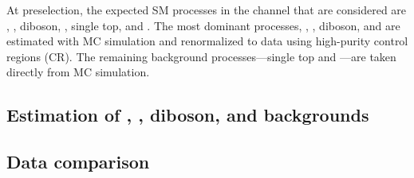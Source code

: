 
At preselection, the expected SM processes in the \mumubj channel that are considered are \ZJETS, \ttbar, diboson, \TTV, single top, and \WJETS. The most dominant processes, \ZJETS, \ttbar, diboson, and \TTV are estimated with MC simulation and renormalized to data using high-purity control regions (CR). The remaining background processes---single top and \WJETS---are taken directly from MC simulation.

\subsection{\texorpdfstring{Estimation of \ZJETS, \ttbar, diboson, and \TTV backgrounds}{Estimation of Z/y* + jets, tt-bar, diboson, and ttV backgrounds}} \label{sec:BkgNorm}


\subsection{Data comparison} \label{sec:DataComparison}
